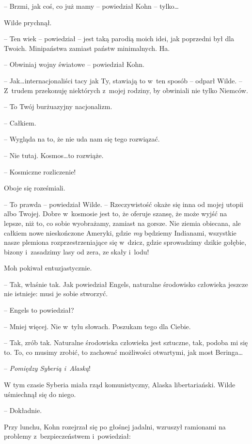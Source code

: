\documentclass[oneside,polish,11pt,sfheadings]{mwbk}
\begin{document}
-- Brzmi, jak coś, co już mamy -- powiedział Kohn -- tylko\ldots

Wilde prychnął. 

-- Ten wiek -- powiedział -- jest taką parodią moich idei,
jak poprzedni był dla Twoich. Minipaństwa zamiast państw minimalnych.
Ha.

-- Obwiniaj wojny światowe -- powiedział Kohn.

-- Jak\ldots internacjonaliści tacy jak Ty, stawiają to w~ten sposób -- odparł Wilde. -- Z~trudem przekonuję niektórych z~mojej rodziny, by
obwiniali nie tylko Niemców.

-- To Twój burżuazyjny nacjonalizm.

-- Całkiem.

-- Wygląda na to, że nie uda nam się tego rozwiązać.

-- Nie tutaj. Kosmos\ldots to rozwiąże.

-- Kosmiczne rozliczenie!

Oboje się roześmiali.

-- To prawda -- powiedział Wilde. -- Rzeczywistość okaże się inna od mojej
utopii albo Twojej. Dobre w~kosmosie jest to, że oferuje szansę, że może
wyjść na lepsze, niż to, co sobie wyobrażamy, zamiast na gorsze. Nie
ziemia obiecana, ale całkiem nowe nieskończone Ameryki, gdzie \emph{my}
będziemy Indianami, wszystkie nasze plemiona rozprzestrzeniające się w~dzicz, gdzie sprowadzimy dzikie gołębie, bizony i~zasadzimy lasy od
zera, ze skały i~lodu!

Moh pokiwał entuzjastycznie. 

-- Tak, właśnie tak. Jak powiedział Engels,
naturalne środowisko człowieka jeszcze nie istnieje: musi je sobie
stworzyć.

-- Engels to powiedział?

-- Mniej więcej. Nie w~tylu słowach. Poszukam tego dla Ciebie.

-- Tak, zrób tak. Naturalne środowiska człowieka jest sztuczne, tak,
podoba mi się to. To, co musimy zrobić, to zachować możliwości
otwartymi, jak most Beringa\ldots

-- \emph{Pomiędzy Syberią i~Alaską}!

W tym czasie Syberia miała rząd komunistyczny, Alaska libertariański.
Wilde uśmiechnął się do niego.

-- Dokładnie.

Przy lunchu, Kohn rozejrzał się po głośnej jadalni, wzruszył ramionami
na problemy z~bezpieczeństwem i~powiedział: 
\end{document}
